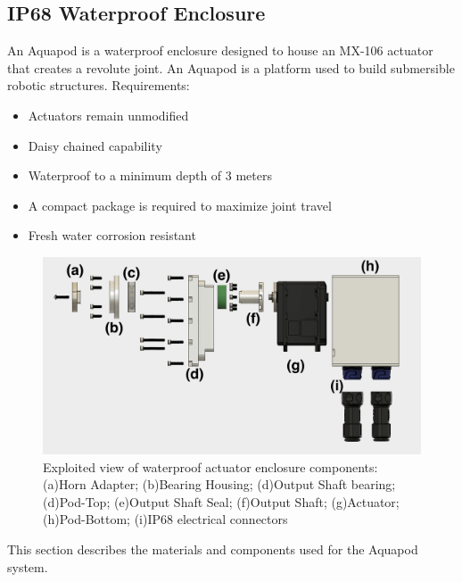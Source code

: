 


\subsection{IP68 Waterproof Enclosure}
An Aquapod is a waterproof enclosure designed to house an MX-106 actuator that creates a revolute joint. An Aquapod is a platform used to build submersible robotic structures.
Requirements: 
\begin{itemize}
    \item Actuators remain unmodified 
    
    \item Daisy chained capability

    \item Waterproof to a minimum depth of 3 meters

    \item A compact package is required to maximize joint travel

    \item Fresh water corrosion resistant
    
\end{itemize}



\begin{figure}[h]
\centering
\includegraphics[width=1.0\columnwidth]{./img/aquaPod-exploded.png}
\caption{Exploited view of waterproof actuator enclosure components: (a)Horn Adapter; (b)Bearing Housing; (d)Output Shaft bearing; (d)Pod-Top; (e)Output Shaft Seal; (f)Output Shaft; (g)Actuator; (h)Pod-Bottom; (i)IP68 electrical connectors }
\label{fig:pod exploted}
\end{figure}


This section describes the materials and components used for the Aquapod system.


